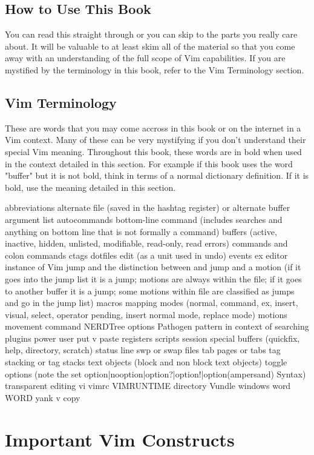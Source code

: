 \documentclass[12pt, oneside]{book}
\begin{document}
\section{How to Use This Book}
You can read this straight through or you can skip to the parts you really care about.  It will be valuable to at least skim all of the material so that you come away with an understanding of the full
scope of Vim capabilities.  If you are mystified by the terminology in this book, refer to the Vim Terminology section.

\section{Vim Terminology}
These are words that you may come accross in this book or on the internet in a Vim context.  Many of these can be very mystifying if you don't understand their special Vim meaning.  Throughout this
book, these words are in bold when used in the context detailed in this section.  For example if this book uses the word "buffer" but it is not bold, think in terms of a normal dictionary definition.
If it is bold, use the meaning detailed in this section.

abbreviations
alternate file (saved in the hashtag register) or alternate buffer
argument list
autocommands
bottom-line command (includes searches and anything on bottom line that is not formally a command)
buffers (active, inactive, hidden, unlisted, modifiable, read-only, read errors)
commands and colon commands
ctags
dotfiles
edit (as a unit used in undo)
events
ex editor
instance of Vim
jump and the distinction between and jump and a motion (if it goes into the jump list it is a jump; motions are always within the file; if it goes to another buffer it is a jump; some motions within file are classified as jumps and go in the jump list)
macros
mapping
modes (normal, command, ex, insert, visual, select, operator pending, insert normal mode, replace mode)
motions
movement command
NERDTree
options
Pathogen
pattern in context of searching
plugins
power user
put v paste
registers
scripts
session
special buffers (quickfix, help, directory, scratch)
status line
swp or swap files
tab pages or tabs
tag stacking or tag stacks
text objects (block and non block text objects)
toggle options (note the set option|nooption|option?|option!|option(ampersand) Syntax)
transparent editing
vi
vimrc
VIMRUNTIME directory
Vundle
windows
word
WORD
yank v copy

\chapter{Important Vim Constructs}
\end{document}
